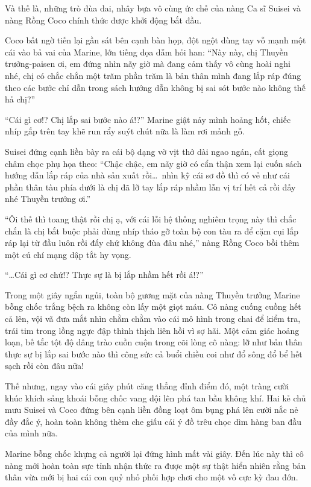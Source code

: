 \documentclass[../main.tex]{subfiles}
\begin{document}
Và thế là, những trò đùa dai, nhây bựa vô cùng ức chế của nàng Ca sĩ Suisei và nàng Rồng Coco chính thức được khởi động bắt đầu.

\ct

Coco bất ngờ tiến lại gần sát bên cạnh bàn họp, đột ngột dùng tay vỗ mạnh một cái vào bả vai của Marine, lớn tiếng dọa dẫm hỏi han: ``Này này, chị Thuyền trưởng-paisen ơi, em đứng nhìn nãy giờ mà đang cảm thấy vô cùng hoài nghi nhé, chị có chắc chắn một trăm phần trăm là bản thân mình đang lắp ráp đúng theo các bước chỉ dẫn trong sách hướng dẫn không bị sai sót bước nào không thế hả chị?''

``Cái gì cơ!? Chị lắp sai bước nào á!?'' Marine giật nảy mình hoảng hốt, chiếc nhíp gắp trên tay khẽ run rẩy suýt chút nữa là làm rơi mảnh gỗ.

Suisei đứng cạnh liền bày ra cái bộ dạng vờ vịt thở dài ngao ngán, cất giọng châm chọc phụ họa theo: ``Chậc chậc, em nãy giờ có cẩn thận xem lại cuốn sách hướng dẫn lắp ráp của nhà sản xuất rồi\dots\ nhìn kỹ cái sơ đồ thì có vẻ như cái phần thân tàu phía dưới là chị đã lỡ tay lắp ráp nhầm lẫn vị trí hết cả rồi đấy nhé Thuyền trưởng ơi.''

``Ôi thế thì toang thật rồi chị ạ, với cái lỗi hệ thống nghiêm trọng này thì chắc chắn là chị bắt buộc phải dùng nhíp tháo gỡ toàn bộ con tàu ra để cặm cụi lắp ráp lại từ đầu luôn rồi đấy chứ không đùa đâu nhé,'' nàng Rồng Coco bồi thêm một cú chí mạng dập tắt hy vọng.

``\dots Cái gì cơ chứ!? Thực sự là bị lắp nhầm hết rồi á!?''

Trong một giây ngắn ngủi, toàn bộ gương mặt của nàng Thuyền trưởng Marine bỗng chốc trắng bệch ra không còn lấy một giọt máu. Cô nàng cuống cuồng hết cả lên, vội vã đưa mắt nhìn chằm chằm vào cái mô hình trong chai để kiểm tra, trái tim trong lồng ngực đập thình thịch liên hồi vì sợ hãi. Một cảm giác hoảng loạn, bế tắc tột độ dâng trào cuồn cuộn trong cõi lòng cô nàng: lỡ như bản thân thực sự bị lắp sai bước nào thì công sức cả buổi chiều coi như đổ sông đổ bể hết sạch rồi còn đâu nữa!

Thế nhưng, ngay vào cái giây phút căng thẳng đỉnh điểm đó, một tràng cười khúc khích sảng khoái bỗng chốc vang dội lên phá tan bầu không khí. Hai kẻ chủ mưu Suisei và Coco đứng bên cạnh liền đồng loạt ôm bụng phá lên cười nắc nẻ đầy đắc ý, hoàn toàn không thèm che giấu cái ý đồ trêu chọc dìm hàng ban đầu của mình nữa.

Marine bỗng chốc khựng cả người lại đứng hình mất vài giây. Đến lúc này thì cô nàng mới hoàn toàn sực tỉnh nhận thức ra được một sự thật hiển nhiên rằng bản thân vừa mới bị hai cái con quỷ nhỏ phối hợp chơi cho một vố cực kỳ đau đớn.
\end{document}
